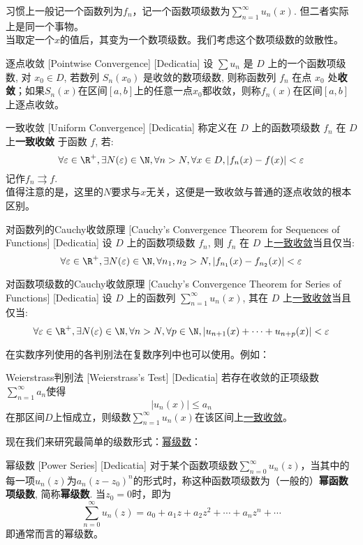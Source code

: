 \documentclass[UTF8]{ctexart}
\newcommand{\PowerSeries}{\hyperref[dfn:PowerSeries]{幂级数}}
\newcommand{\UniformConvergence}{\hyperref[dfn:UniformConvergence]{一致收敛}}
\begin{document}
习惯上一般记一个函数列为$f_n$，记一个函数项级数为$\sum_{n = 1}^{\infty} u_n(x) $. 但二者实际上是同一个事物。\\
当取定一个$x$的值后，其变为一个数项级数。我们考虑这个数项级数的敛散性。
\begin{dfn}
    [UUID]
    {逐点收敛}
    [Pointwise Convergence]
    [Dedicatia]
    设 \(\sum u_n\) 是 \(D\) 上的一个函数项级数, 对 \(x_0\in D\), 若数列 \(S_n(x_0)\) 是收敛的数项级数, 则称函数列 \(f_n\) 在点 \(x_0\) 处\textbf{收敛}；如果$S_n(x)$在区间$[a,b]$上的任意一点$x_0$都收敛，则称$f_n(x)$在区间$[a,b]$上逐点收敛。
\end{dfn}
\begin{dfn}
    [UUID]
    {一致收敛\label{dfn:UniformConvergence}}
    [Uniform Convergence]
    [Dedicatia]
    称定义在 \(D\) 上的函数项级数 \(f_n\) 在 \(D\) 上\textbf{一致收敛} 于函数 \(f\), 若: 
    \[\forall\varepsilon\in\R^+, \exists N(\varepsilon)\in\N, \forall n>N, \forall x\in D, |f_n(x)-f(x)|<\varepsilon\]
    记作$f_n\rightrightarrows f$.\\
    值得注意的是，这里的$N$要求与$x$无关，这便是一致收敛与普通的逐点收敛的根本区别。
\end{dfn}
\begin{crl}
    [UUID]
    {对函数列的Cauchy收敛原理}
    [Cauchy's Convergence Theorem for Sequences of Functions]
    [Dedicatia]
    设 \(D\) 上的函数项级数 \(f_n\), 则 \(f_n\) 在 \(D\) 上\UniformConvergence 当且仅当: 
	\[\forall\varepsilon\in\R^+, \exists N(\varepsilon)\in\N, \forall n_1,n_2>N, |f_{n_1}(x)-f_{n_2}(x)|<\varepsilon\]
\end{crl}
\begin{crl}
    [UUID]
    {对函数项级数的Cauchy收敛原理}
    [Cauchy's Convergence Theorem for Series of Functions]
    [Dedicatia]
    设 \(D\) 上的函数列 \(\sum_{n=1}^{\infty} u_n(x)\), 其在 \(D\) 上\UniformConvergence 当且仅当: 
	\[\forall\varepsilon\in\R^+, \exists N(\varepsilon)\in\N, \forall n>N, \forall p\in\N, |u_{n+1}(x)+\cdots+u_{n+p}(x)|<\varepsilon\]
\end{crl}
在实数序列使用的各判别法在复数序列中也可以使用。例如：
\begin{thm}
    [UUID]
    {Weierstrass判别法}
    [Weierstrass's Test]
    [Dedicatia]
    若存在收敛的正项级数$\sum_{n = 1}^{\infty} a_n $使得\[|u_n(x)|\leqslant a_n\]
    在那区间$D$上恒成立，则级数$\sum_{n = 1}^{\infty} u_n(x) $在该区间上\UniformConvergence 。
\end{thm}
现在我们来研究最简单的级数形式：\PowerSeries ：
\begin{dfn}
    [UUID]
    {幂级数\label{dfn:PowerSeries}}
    [Power Series]
    [Dedicatia]
    对于某个函数项级数$\sum_{n = 0}^{\infty} u_n(z) $，当其中的每一项$u_n(z)$为$a_n(z-z_0)^n$的形式时，称这种函数项级数为（一般的）\textbf{幂函数项级数}, 简称\textbf{幂级数}. 当$z_0=0$时，即为
    \[\sum_{n = 0}^{\infty} u_n(z)=a_0+a_1z+a_2z^2+\cdots+a_nz^n+\cdots \tag{$\star$}\]
    即通常而言的幂级数。
\end{dfn}
\end{document}
